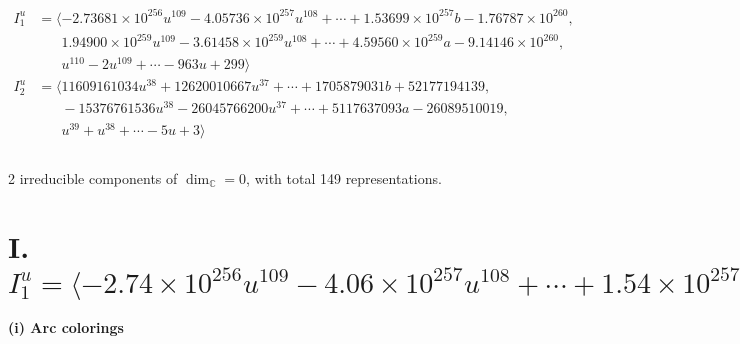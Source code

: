 \documentclass[1p]{elsarticle_modified}
\theoremstyle{definition}
\begin{document}
\begin{align*}
I^u_{1}&=\langle 
-2.73681\times10^{256} u^{109}-4.05736\times10^{257} u^{108}+\cdots+1.53699\times10^{257} b-1.76787\times10^{260},\\
\phantom{I^u_{1}}&\phantom{= \langle  }1.94900\times10^{259} u^{109}-3.61458\times10^{259} u^{108}+\cdots+4.59560\times10^{259} a-9.14146\times10^{260},\\
\phantom{I^u_{1}}&\phantom{= \langle  }u^{110}-2 u^{109}+\cdots-963 u+299\rangle \\
I^u_{2}&=\langle 
11609161034 u^{38}+12620010667 u^{37}+\cdots+1705879031 b+52177194139,\\
\phantom{I^u_{2}}&\phantom{= \langle  }-15376761536 u^{38}-26045766200 u^{37}+\cdots+5117637093 a-26089510019,\\
\phantom{I^u_{2}}&\phantom{= \langle  }u^{39}+u^{38}+\cdots-5 u+3\rangle \\
\\
\end{align*}
\raggedright * 2 irreducible components of $\dim_{\mathbb{C}}=0$, with total 149 representations.\\
\newpage
\renewcommand{\arraystretch}{1}
\centering \section*{I. $I^u_{1}= \langle -2.74\times10^{256} u^{109}-4.06\times10^{257} u^{108}+\cdots+1.54\times10^{257} b-1.77\times10^{260},\;1.95\times10^{259} u^{109}-3.61\times10^{259} u^{108}+\cdots+4.60\times10^{259} a-9.14\times10^{260},\;u^{110}-2 u^{109}+\cdots-963 u+299 \rangle$}
\flushleft \textbf{(i) Arc colorings}\\
\end{document}
